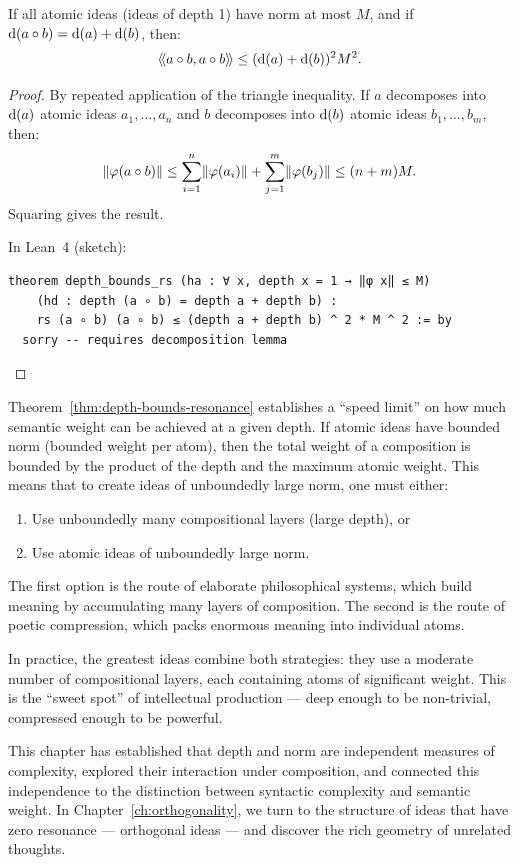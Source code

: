 \begin{theorem}
\label{thm:depth-bounds-resonance}
If all atomic ideas (ideas of depth 1) have norm at most $M$, and if
$\operatorname{d}(a \circ b) = \operatorname{d}(a) + \operatorname{d}(b)$, then:
\[
  \langle\!\langle a \circ b, a \circ b \rangle\!\rangle \leq (\operatorname{d}(a) + \operatorname{d}(b))^2 M^2.
\]
\end{theorem}

\begin{proof}
By repeated application of the triangle inequality. If $a$ decomposes into
$\operatorname{d}(a)$ atomic ideas $a_1, \ldots, a_n$ and $b$ decomposes into $\operatorname{d}(b)$
atomic ideas $b_1, \ldots, b_m$, then:
\[
  \lVert \varphi(a \circ b) \rVert \leq \sum_{i=1}^n \lVert \varphi(a_i) \rVert +
  \sum_{j=1}^m \lVert \varphi(b_j) \rVert \leq (n + m)M.
\]
Squaring gives the result.

In Lean~4 (sketch):
\begin{lstlisting}
theorem depth_bounds_rs (ha : ∀ x, depth x = 1 → ‖φ x‖ ≤ M)
    (hd : depth (a ∘ b) = depth a + depth b) :
    rs (a ∘ b) (a ∘ b) ≤ (depth a + depth b) ^ 2 * M ^ 2 := by
  sorry -- requires decomposition lemma
\end{lstlisting}
\end{proof}

\begin{interpretation}
\label{interp:speed-limit}
Theorem~\ref{thm:depth-bounds-resonance} establishes a ``speed limit'' on how
much semantic weight can be achieved at a given depth. If atomic ideas have
bounded norm (bounded weight per atom), then the total weight of a composition
is bounded by the product of the depth and the maximum atomic weight. This
means that to create ideas of unboundedly large norm, one must either:
\begin{enumerate}
\item Use unboundedly many compositional layers (large depth), or
\item Use atomic ideas of unboundedly large norm.
\end{enumerate}
The first option is the route of elaborate philosophical systems, which build
meaning by accumulating many layers of composition. The second is the route
of poetic compression, which packs enormous meaning into individual atoms.

In practice, the greatest ideas combine both strategies: they use a moderate
number of compositional layers, each containing atoms of significant weight.
This is the ``sweet spot'' of intellectual production --- deep enough to be
non-trivial, compressed enough to be powerful.
\end{interpretation}

\bigskip

This chapter has established that depth and norm are independent measures of
complexity, explored their interaction under composition, and connected this
independence to the distinction between syntactic complexity and semantic
weight. In Chapter~\ref{ch:orthogonality}, we turn to the structure of ideas
that have zero resonance --- orthogonal ideas --- and discover the rich
geometry of unrelated thoughts.
